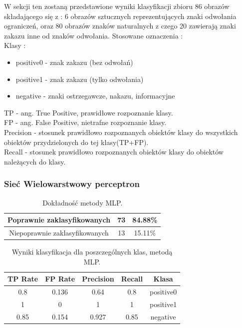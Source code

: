 \documentclass{classrep}
\begin{document}
W sekcji ten zostaną przedstawione wyniki klasyfikacji zbioru 86 obrazów składającego się z : 6 obrazów sztucznych reprezentujących znaki odwołania ograniczeń, oraz 80 obrazów znaków naturalnych z czego 20 zawierają znaki zakazu inne od znaków odwołania.
Stosowane oznaczenia :\\
Klasy :
\begin{itemize}
\item positive0 - znak zakazu (bez odwołań)
\item positive1 - znak zakazu (tylko odwołania)
\item negative - znaki ostrzegawcze, nakazu, informacyjne
\end{itemize} 
TP - ang. True Positive, prawidłowe rozpoznanie klasy.\\
FP - ang. False Positive, nietrafne rozpoznanie klasy.\\
Precision - stosunek prawidłowo rozpoznanych obiektów klasy do wszystkich obiektów przydzielonych do tej klasy(TP+FP).\\
Recall - stosunek prawidłowo rozpoznanych obiektów klasy do obiektów należących do klasy.


\subsubsection{Sieć Wielowarstwowy perceptron}

\begin{table}[H]
\centering
\begin{tabular}{|c|c|c|}
\hline 
Poprawnie zaklasyfikowanych & 73 & 84.88\% \\ 
\hline 
Niepoprawnie zaklasyfikowanych & 13 & 15.11\% \\ 
\hline 
\end{tabular} 
\caption{Dokładność metody MLP.}
\label{wyniki:mlpproc}
\end{table}



\begin{table}[H]
\centering
\begin{tabular}{|c|c|c|c|c|}
\hline 
TP Rate &  FP Rate & Precision &  Recall &  Klasa \\
\hline
0.8    &   0.136   &   0.64  &    0.8  &  positive0 \\
\hline
1      &   0     &     1    &     1   &   positive1 \\
\hline
0.85    &  0.154  &    0.927  &   0.85  & negative \\
\hline 
\end{tabular} 
\caption{Wyniki klasyfikacja dla poszczególnych klas, metodą MLP.}
\label{wyniki:mlpclass}
\end{table}
\end{document}
